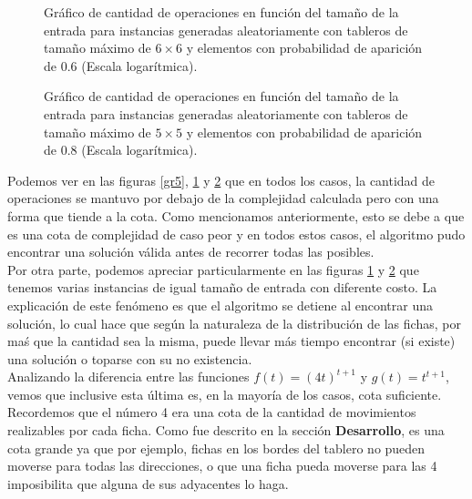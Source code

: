 \documentclass[10pt, a4paper,english,spanish]{article}
\begin{document}
\begin{figure}[H]
	 \begin{center}
	   \caption{Gráfico de cantidad de operaciones en función del tamaño de la entrada para instancias generadas 
	   aleatoriamente con tableros de tamaño máximo de $6\times 6$ y elementos con probabilidad de aparición de 0.6
	  (Escala logarítmica).}  
	   \label{gr6}
	 \end{center}
\end{figure}

\begin{figure}[H]
	 \begin{center}
	   \caption{Gráfico de cantidad de operaciones en función del tamaño de la entrada para instancias generadas 
	   aleatoriamente con tableros de tamaño máximo de $5\times 5$ y elementos con probabilidad de aparición de 0.8
	  (Escala logarítmica).} 
	   \label{gr7}
	 \end{center}
\end{figure}

Podemos ver en las figuras \ref{gr5}, \ref{gr6} y \ref{gr7} que en todos los casos, la cantidad de operaciones se mantuvo por 
debajo de la complejidad calculada pero con una forma que tiende a la cota. 
Como mencionamos anteriormente, esto se debe a que es una cota de complejidad de caso peor
y en todos estos casos, el algoritmo pudo encontrar una solución válida antes de recorrer todas las posibles. \\
\indent Por otra parte, podemos apreciar particularmente en las figuras \ref{gr6} y \ref{gr7} que tenemos varias
instancias de igual tamaño de entrada con diferente costo. La explicación de este fenómeno es que el algoritmo se detiene
al encontrar una solución, lo cual hace que según la naturaleza de la distribución de las fichas, por maś que la cantidad
sea la misma, puede llevar más tiempo encontrar (si existe) una solución o toparse con su no existencia. \\
\indent Analizando la diferencia entre las funciones $f(t) = (4t)^{t+1}$ y $g(t) = t^{t+1}$, vemos que inclusive esta última
es, en la mayoría de los casos, cota suficiente. Recordemos que el número 4 era una cota de la cantidad de movimientos realizables
por cada ficha. Como fue descrito en la sección \textbf{Desarrollo}, es una cota grande ya que por ejemplo, fichas
en los bordes del tablero no pueden moverse para todas las direcciones, o que una ficha pueda moverse para las 4
imposibilita que alguna de sus adyacentes lo haga. 
\end{document}
